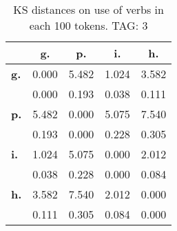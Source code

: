 \begin{table}[h!]
\begin{center}
\begin{tabular}{| l || c | c | c | c |}\hline
 & {\bf g.} & {\bf p.} & {\bf i.} & {\bf h.} \\\hline\hline
{\bf g.} & 0.000 & 5.482 & 1.024 & 3.582 \\
{\bf } & 0.000 & 0.193 & 0.038 & 0.111 \\\hline
{\bf p.} & 5.482 & 0.000 & 5.075 & 7.540 \\
{\bf } & 0.193 & 0.000 & 0.228 & 0.305 \\\hline
{\bf i.} & 1.024 & 5.075 & 0.000 & 2.012 \\
{\bf } & 0.038 & 0.228 & 0.000 & 0.084 \\\hline
{\bf h.} & 3.582 & 7.540 & 2.012 & 0.000 \\
{\bf } & 0.111 & 0.305 & 0.084 & 0.000 \\\hline
\end{tabular}
\caption{KS distances on use of verbs in each 100 tokens. TAG: 3}
\end{center}
\end{table}